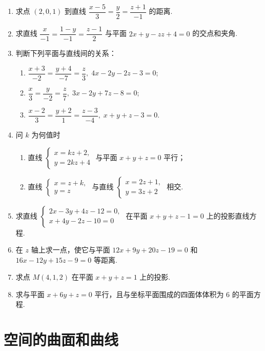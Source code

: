 \begin{enumerate}
    \item 求点 $(2, 0, 1)$ 到直线 $\dfrac{x-5}{3}=\dfrac{y}{2}=\dfrac{z+1}{-1}$ 的距离.
    
    \item 求直线 $\dfrac{x}{-1}=\dfrac{1-y}{-1}=\dfrac{z-1}{2}$ 与平面 $2x+y-zz+4=0$ 的交点和夹角.
    
    \item 判断下列平面与直线间的关系：
    \begin{enumerate}[(1)]\setlength{\itemsep}{5pt}\setlength{\topsep}{15pt}
        \item $\dfrac{x+3}{-2}=\dfrac{y+4}{-7}=\dfrac{z}{3},\;4x-2y-2z-3=0$;
        \item $\dfrac{x}{3}=\dfrac{y}{-2}=\dfrac{z}{7},\;3x-2y+7z-8=0$;
        \item $\dfrac{x-2}{3}=\dfrac{y+2}{1}=\dfrac{z-3}{-4},\;x+y+z-3=0$.
    \end{enumerate}

    \item 问 $k$ 为何值时
    \begin{enumerate}[(1)]\setlength{\itemsep}{5pt}\setlength{\topsep}{15pt}
        \item 直线 $\begin{cases}
            x=kz+2,\\
            y=2kz+4
        \end{cases}$ 与平面 $x+y+z=0$ 平行；
        \item 直线 $\begin{cases}
            x=z+k,\\
            y=z
        \end{cases}$ 与直线 $\begin{cases}
            x=2z+1,\\
            y=3z+2
        \end{cases}$ 相交.
    \end{enumerate}

    \item 求直线 $\begin{cases}
        2x-3y+4z-12=0,\\
        x+4y-2z-10=0
    \end{cases}$ 在平面 $x+y+z-1=0$ 上的投影直线方程.

    \item 在 $z$ 轴上求一点，使它与平面 $12x+9y+20z-19=0$ 和 $16x-12y+15z-9=0$ 等距离.
    
    \item 求点 $M(4, 1, 2)$ 在平面 $x+y+z=1$ 上的投影.
    
    \item 求与平面 $x+6y+z=0$ 平行，且与坐标平面围成的四面体体积为 $6$ 的平面方程.
\end{enumerate}

\section{空间的曲面和曲线}






